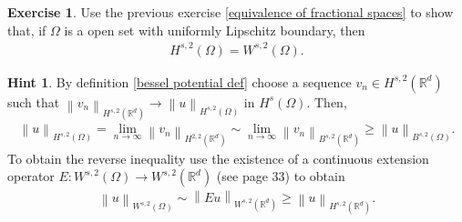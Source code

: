 \documentclass[
    a4paper,
    DIV=14,
    abstract=true,
    numbers=noenddot
]
{scrartcl}
\theoremstyle{definition}
\newtheorem{exercise}{Exercise}
\newtheorem*{hint}{Hint}
\renewcommand{\norm}[1]{\left\lVert #1 \right\rVert}\renewcommand{\abs}[1]{\left| #1 \right|}
\newcommand{\R}{\mathbb{R}}
\begin{document}
\begin{exercise}
    Use the previous exercise \ref{equivalence of fractional spaces} to show that, if $\Omega $ is a open set with uniformly Lipschitz boundary, then
    \begin{align*}
        H^{s,2}(\Omega )=W^{s,2}(\Omega ).
    \end{align*}
\end{exercise}
\begin{hint}
    By definition \ref{bessel potential def} choose a sequence $v_n \in H^{s,2}(\R^d)$ such that $\norm{v_n}_{H^{s,2}(\R^d)} \to \norm{u}_{H^{s,2}(\Omega )}$ in $H^s(\Omega )$. Then,
    \begin{align*}
        \norm{u}_{H^{s,2}(\Omega)}= \lim_{n\to\infty}\norm{v_n}_{H^{2,2}(\R^d)}\sim \lim_{n\to\infty}\norm{v_n}_{B^{s,2}(\R^d)}\geq \norm{u}_{B^{s,2}(\Omega )}.
    \end{align*}
    To obtain the reverse inequality use the existence of a continuous extension operator $E:W^{s,2}(\Omega )\to W^{s,2}(\R^d)$ (see \cite{di2012hitchhiker's} page 33) to obtain
    \begin{align*}
        \norm{u}_{W^{s,2}(\Omega )}\sim \norm{Eu}_{W^{s,2}(\R^d)}\geq \norm{u}_{H^{s,2}(\R^d)}.
    \end{align*}

\end{hint}
\end{document}
